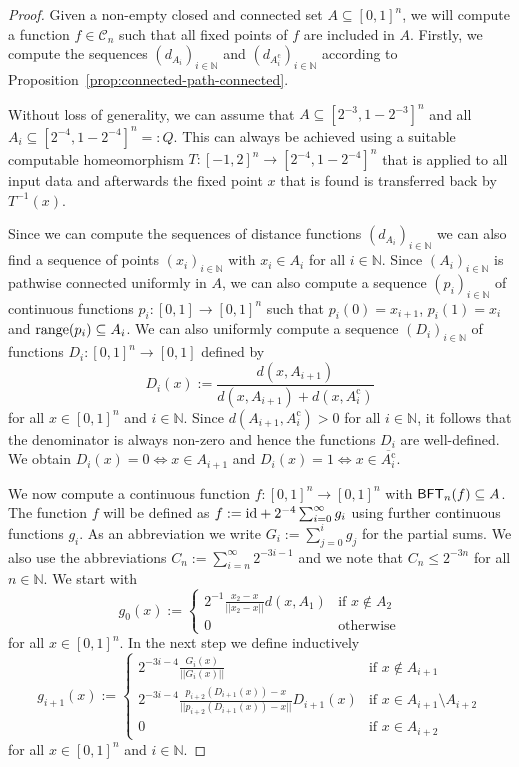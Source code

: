 \documentclass[a4paper]{amsart}
\def\CC{{\mathcal C}}
\def\IN{{\mathbb{N}}}
\def\In{\subseteq}
\def\id{{\rm id}}
\def\range{{\rm range}}
\def\cc{\mathrm c}
\def\BFT{\mbox{\rm\sffamily BFT}}
\theoremstyle{definition}
\begin{document}
\begin{proof}
Given a non-empty closed and connected set $A\In[0,1]^n$, we will compute a function $f\in\CC_n$ such that 
all fixed points of $f$ are included in $A$.
Firstly, we compute the sequences $(d_{A_i})_{i\in\IN}$ and $(d_{A_i^\cc})_{i\in\IN}$
according to Proposition~\ref{prop:connected-path-connected}.

Without loss of generality, we can assume that $A\In[2^{-3},1-2^{-3}]^n$ and all $A_i\In[2^{-4},1-2^{-4}]^n=:Q$. 
This can always be achieved using a suitable computable homeomorphism $T:[-1,2]^n\to[2^{-4},1-2^{-4}]^n$ that is applied
to all input data and afterwards the fixed point $x$ that is found is transferred back by $T^{-1}(x)$.

Since we can compute the sequences of distance functions $(d_{A_i})_{i\in\IN}$
we can also find a sequence of points $(x_i)_{i\in\IN}$ with $x_i\in A_i$ for all $i\in\IN$. 
Since $(A_i)_{i\in\IN}$ is pathwise connected uniformly in $A$, 
we can also compute a sequence $(p_i)_{i\in\IN}$ of continuous functions $p_i:[0,1]\to[0,1]^n$
such that $p_i(0)=x_{i+1}$, $p_i(1)=x_i$ and $\range(p_i)\In A_i$. 
We can also uniformly compute a sequence $(D_i)_{i\in\IN}$ of functions $D_i:[0,1]^n\to[0,1]$ defined by
\[D_i(x):=\frac{d(x,A_{i+1})}{d(x,A_{i+1})+d(x,A_{i}^\cc)}\]
for all $x\in[0,1]^n$ and $i\in\IN$. Since $d(A_{i+1},A_i^\cc)>0$ for all $i\in\IN$, it follows
that the denominator is always non-zero and hence the functions $D_i$ are well-defined.
We obtain $D_i(x)=0\iff x\in A_{i+1}$ and $D_i(x)=1\iff x\in\overline{A_i^\cc}$.

We now compute a continuous function $f:[0,1]^n\to[0,1]^n$ with $\BFT_n(f)\In A$. 
The function $f$ will be defined as $f:=\id+2^{-4}\sum_{i=0}^\infty g_i$ using further continuous functions $g_i$.
As an abbreviation we write $G_i:=\sum_{j=0}^{i}g_j$ for the partial sums.
We also use the abbreviations $C_n:=\sum_{i=n}^\infty2^{-3i-1}$ and we note that $C_n\leq2^{-3n}$ for all $n\in\IN$.
We start with
\[g_0(x):=\left\{\begin{array}{ll}
2^{-1}\frac{\displaystyle x_2-x}{\displaystyle||x_2-x||}d(x,A_1) & \mbox{if $x\not\in A_2$}\\
0 & \mbox{otherwise}
\end{array}\right.\]
for all $x\in[0,1]^n$. 
In the next step we define inductively
\[g_{i+1}(x):=\left\{\begin{array}{ll}
2^{-3i-4}\frac{\displaystyle G_{i}(x)}{\displaystyle||G_{i}(x)||} & \mbox{if $x\not\in A_{i+1}$}\\[0.2cm]
2^{-3i-4}\frac{\displaystyle p_{i+2}(D_{i+1}(x))-x}{\displaystyle||p_{i+2}(D_{i+1}(x))-x||}D_{i+1}(x) & \mbox{if $x\in A_{i+1}\setminus A_{i+2}$}\\[0.2cm]
0 & \mbox{if $x\in A_{i+2}$}
\end{array}\right.\]
for all $x\in[0,1]^n$ and $i\in\IN$.


\end{proof}
\end{document}
